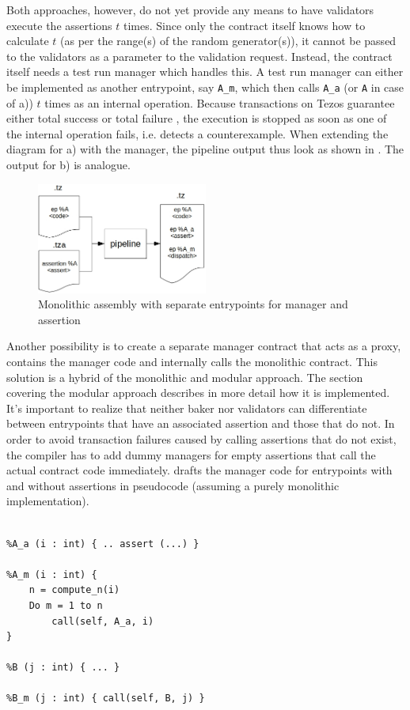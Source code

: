 Both approaches, however, do not yet provide any means to have validators execute the assertions $t$ times. Since only the contract itself knows how to calculate $t$ (as per the range(s) of the random generator(s)), it cannot be passed to the validators as a parameter to the validation request. Instead, the contract itself needs a test run manager which handles this. A test run manager can either be implemented as another entrypoint, say \texttt{A\_m}, which then calls \texttt{A\_a} (or \texttt{A} in case of a)) $t$ times as an internal operation. Because transactions on Tezos guarantee either total success or total failure \cite{tezos_docs}, the execution is stopped as soon as one of the internal operation fails, i.e. detects a counterexample. When extending the diagram for a) with the manager, the pipeline output thus look as shown in . The output for b) is analogue.
\begin{figure}[h]
\centering
  \includegraphics[width=0.5\textwidth]{figures/5-offline_tezos/pipeline_output_mono_ep.jpg}
	\caption{Monolithic assembly with separate entrypoints for manager and assertion}
	\label{fig:monolithic_orchestration}
\end{figure}
Another possibility is to create a separate manager contract that acts as a proxy, contains the manager code and internally calls the monolithic contract. This solution is a hybrid of the monolithic and modular approach. The section covering the modular approach describes in more detail how it is implemented.\\
It's important to realize that neither baker nor validators can differentiate between entrypoints that have an associated assertion and those that do not. In order to avoid transaction failures caused by calling assertions that do not exist, the compiler has to add dummy managers for empty assertions that call the actual contract code immediately.  drafts the manager code for entrypoints with and without assertions in pseudocode (assuming a purely monolithic implementation). 
\begin{lstlisting}[label=lst:manager, caption=Implementation of the manager in pseudocode]
%A (i : int) { ... }

%A_a (i : int) { .. assert (...) }

%A_m (i : int) {
	n = compute_n(i)
	Do m = 1 to n
		call(self, A_a, i)
}

%B (j : int) { ... }

%B_m (j : int) { call(self, B, j) }
\end{lstlisting}

